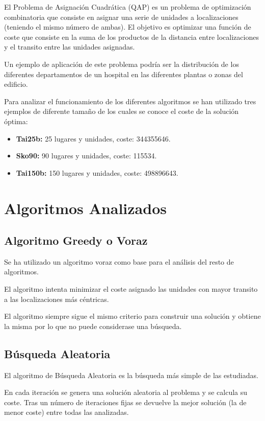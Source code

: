 \documentclass[runningheads,a4paper]{llncs}
\begin{document}
El Problema de Asignación Cuadrática (QAP) es un problema de optimización combinatoria que consiste en asignar una serie de unidades a localizaciones (teniendo el mismo número de ambas). El objetivo es optimizar una función de coste que consiste en la suma de los productos de la distancia entre localizaciones y el transito entre las unidades asignadas.


 Un ejemplo de aplicación de este problema podría ser la distribución de los diferentes departamentos de un hospital en las diferentes plantas o zonas del edificio.

Para analizar el funcionamiento de los diferentes algoritmos se han utilizado tres ejemplos de diferente tamaño de los cuales se conoce el coste de la solución óptima:

\begin{itemize}
\item \textbf{Tai25b:} 25 lugares y unidades, coste: 344355646.
\item \textbf{Sko90:} 90 lugares y unidades, coste: 115534.
\item \textbf{Tai150b:} 150 lugares y unidades, coste: 498896643.
\end{itemize}

\section{Algoritmos Analizados}

\subsection{Algoritmo Greedy o Voraz}

Se ha utilizado un algoritmo voraz como base para el análisis del resto de algoritmos.

El algoritmo intenta minimizar el coste asignado las unidades con mayor transito a las localizaciones más céntricas.

El algoritmo siempre sigue el mismo criterio para construir una solución y obtiene la misma por lo que no puede considerase una búsqueda.

\subsection{Búsqueda Aleatoria}

El algoritmo de Búsqueda Aleatoria es la búsqueda más simple de las estudiadas.

En cada iteración se genera una solución aleatoria al problema y se calcula su coste. Tras un número de iteraciones fijas se devuelve la mejor solución (la de menor coste) entre todas las analizadas.
\end{document}
